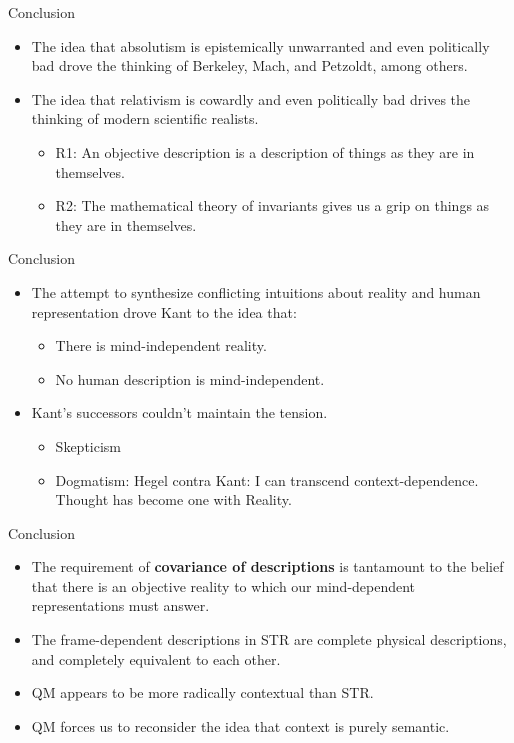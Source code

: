 \documentclass[fleqn]{beamer}
\begin{document}
\begin{frame}{Conclusion}

  \begin{itemize}
  \item The idea that absolutism is epistemically unwarranted and even
    politically bad drove the thinking of Berkeley, Mach, and
    Petzoldt, among others.
  \item The idea that relativism is cowardly and even politically bad
    drives the thinking of modern scientific realists.
    \begin{itemize}
    \item R1: An objective description is a description of things as
      they are in themselves.
    \item R2: The mathematical theory of invariants gives us a grip on
      things as they are in themselves.
    \end{itemize}
  \end{itemize}

\end{frame}

\begin{frame}{Conclusion}

  \begin{itemize}
  \item The attempt to synthesize conflicting intuitions about reality
    and human representation drove Kant to the idea that:
    \begin{itemize}
    \item There is mind-independent reality.
    \item No human description is mind-independent.
    \end{itemize}
  \item Kant's successors couldn't maintain the tension.
    \begin{itemize}
    \item Skepticism
    \item Dogmatism: Hegel contra Kant: I can transcend
      context-dependence. Thought has become one with Reality.
    \end{itemize}
  \end{itemize}  

  \end{frame}

  \begin{frame}{Conclusion}
  \begin{itemize}
  \item The requirement of \textbf{covariance of descriptions} is
    tantamount to the belief that there is an objective reality to
    which our mind-dependent representations must answer.
  \item The frame-dependent descriptions in STR are complete physical
    descriptions, and completely equivalent to each other.
  \item QM appears to be more radically contextual than STR.
  \item QM forces us to reconsider the idea that context is purely
    semantic.
  \end{itemize}

\end{frame}
\end{document}
